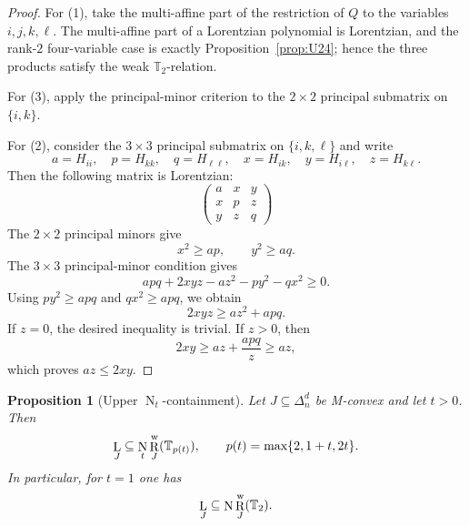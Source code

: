 \documentclass[12pt]{amsart}
\newtheorem{proposition}[theorem]{Proposition}
\theoremstyle{definition}
\newcommand{\1}{\mathbf{1}}
\DeclareMathOperator{\upN}{N}   %
\DeclareMathOperator{\upL}{L}   %
\DeclareMathOperator{\upR}{R}   %
\newcommand\T{{\mathbb T}}
\renewcommand\max{\textup{max}}
\begin{document}
\begin{proof}
For (1), take the multi-affine part of the restriction of $Q$ to the variables
$i,j,k,\ell$.  The multi-affine part of a Lorentzian polynomial is Lorentzian,
and the rank-$2$ four-variable case is exactly Proposition~\ref{prop:U24}; hence
the three products satisfy the weak $\T_2$-relation.

For (3), apply the principal-minor criterion to the $2\times 2$ principal
submatrix on $\{i,k\}$.

For (2), consider the $3\times 3$ principal submatrix on $\{i,k,\ell\}$ and write
\[
a=H_{ii},\quad p=H_{kk},\quad q=H_{\ell\ell},
\quad
x=H_{ik},\quad y=H_{i\ell},\quad z=H_{k\ell}.
\]
Then the following matrix is Lorentzian:
\begin{equation*}
    \begin{pmatrix}
        a & x & y \\
        x & p & z \\
        y & z & q
    \end{pmatrix}
\end{equation*}
The $2\times 2$ principal minors give
\[
x^2\ge ap,
\qquad
y^2\ge aq.
\]
The $3\times 3$ principal-minor condition gives
\[
apq+2xyz-az^2-py^2-qx^2\ge 0.
\]
Using $py^2\ge apq$ and $qx^2\ge apq$, we obtain
\[
2xyz\ge az^2+apq.
\]
If $z=0$, the desired inequality is trivial.  If $z>0$, then
\[
2xy\ge az+\frac{apq}{z}\ge az,
\]
which proves $az\le 2xy$.
\end{proof}

\begin{proposition}[Upper $\upN_t$-containment]
\label{prop:upper-Nt}
Let $J\subseteq\Delta_n^d$ be M-convex and let $t>0$.  Then
\[
\upL_J\subseteq \upN_t\upR_J^{\rm w}(\T_{p(t)}),
\qquad
p(t)=\max\{2,1+t,2t\}.
\]
In particular, for $t=1$ one has
\[
\upL_J\subseteq \upN\upR_J^{\rm w}(\T_2).
\]
\end{proposition}
\end{document}
